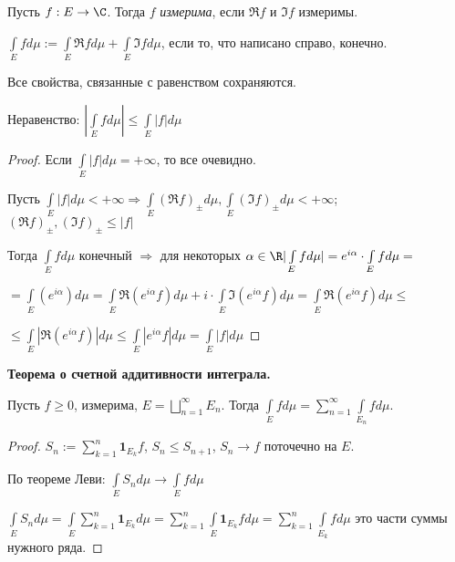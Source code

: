 \begin{definition}
    Пусть $f:E\rightarrow \C$. Тогда $f$ \textit{измерима}, если $\Re f$ и $\Im f$ измеримы.

    $\int\limits_E f d \mu :=\int\limits_E \Re f d\mu + \int\limits_E \Im f d \mu$, если то, что написано справо, конечно.
\end{definition}

\begin{remark}
    Все свойства, связанные с равенством сохраняются.
\end{remark}

\begin{statement}
    Неравенство: $|\int\limits_E f d\mu|\leq \int\limits_E  |f| d\mu$
\end{statement}

\begin{proof}
    Если $\int\limits_E |f| d\mu=+\infty$, то все очевидно. 
    
    Пусть $\int\limits_E |f| d\mu<+\infty\Rightarrow 
    \int\limits_E (\Re f)_\pm d\mu, \int\limits_E (\Im f)_\pm d\mu<+\infty$; $(\Re f)_\pm, (\Im f)_\pm\leq |f|$

    Тогда $\int\limits_E f d\mu$ конечный $\Rightarrow$ для некоторых 
    $\alpha\in \R|\int\limits_E f d\mu|= e^{i\alpha}\cdot \int\limits_E f d\mu=$
    

    $=\int\limits_E (e^{i\alpha}) d\mu=\int\limits_E \Re(e^{i\alpha}f) d\mu+i\cdot \int\limits_E \Im(e^{i\alpha}f) d\mu
    =\int\limits_E \Re(e^{i\alpha}f) d\mu\leq $

    $\leq \int\limits_E |\Re(e^{i\alpha}f)| d\mu\leq \int\limits_E |e^{i\alpha}f| d\mu = \int\limits_E |f| d\mu$
\end{proof}

\begin{theorem}
    \textbf{Теорема о счетной аддитивности интеграла.}

    Пусть $f\geq 0$, измерима, $E=\bigsqcup\limits_{n=1}^\infty E_n$. 
    Тогда $\int\limits_E f d\mu=\sum\limits_{n=1}^\infty\int\limits_{E_n} f d\mu$.
\end{theorem}

\begin{proof}
    $S_n:= \sum\limits_{k=1}^n \mathbf{1}_{E_k} f$, $S_n\leq S_{n+1}$, 
    $S_n\rightarrow f$ поточечно на $E$.

    По теореме Леви: $\int\limits_E S_n d\mu\rightarrow \int\limits_E f d\mu$

    $\int\limits_E S_n d\mu=\int\limits_E \sum\limits_{k=1}^n \mathbf{1}_{E_k}d\mu=
    \sum\limits_{k=1}^n\int\limits_E \mathbf{1}_{E_k}f d\mu= \sum\limits_{k=1}^n \int\limits_{E_k} fd\mu$
    это части суммы нужного ряда.
\end{proof}

